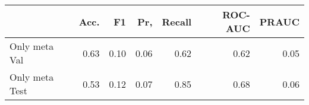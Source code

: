 \begin{tabular}{lrrrrrr}
\toprule
{} &  Acc. &    F1 &   Pr, &  Recall &  ROC-AUC &  PRAUC \\
\midrule
Only meta Val  &  0.63 &  0.10 &  0.06 &    0.62 &     0.62 &   0.05 \\
Only meta Test &  0.53 &  0.12 &  0.07 &    0.85 &     0.68 &   0.06 \\
\bottomrule
\end{tabular}
